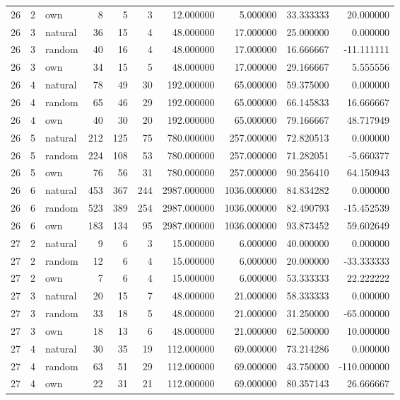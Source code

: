 \begin{table}[htbp]
\begin{tabular}{rrlrrrrrrr}
26 & 2 & own & 8 & 5 & 3 & 12.000000 & 5.000000 & 33.333333 & 20.000000 \\
26 & 3 & natural & 36 & 15 & 4 & 48.000000 & 17.000000 & 25.000000 & 0.000000 \\
26 & 3 & random & 40 & 16 & 4 & 48.000000 & 17.000000 & 16.666667 & -11.111111 \\
26 & 3 & own & 34 & 15 & 5 & 48.000000 & 17.000000 & 29.166667 & 5.555556 \\
26 & 4 & natural & 78 & 49 & 30 & 192.000000 & 65.000000 & 59.375000 & 0.000000 \\
26 & 4 & random & 65 & 46 & 29 & 192.000000 & 65.000000 & 66.145833 & 16.666667 \\
26 & 4 & own & 40 & 30 & 20 & 192.000000 & 65.000000 & 79.166667 & 48.717949 \\
26 & 5 & natural & 212 & 125 & 75 & 780.000000 & 257.000000 & 72.820513 & 0.000000 \\
26 & 5 & random & 224 & 108 & 53 & 780.000000 & 257.000000 & 71.282051 & -5.660377 \\
26 & 5 & own & 76 & 56 & 31 & 780.000000 & 257.000000 & 90.256410 & 64.150943 \\
26 & 6 & natural & 453 & 367 & 244 & 2987.000000 & 1036.000000 & 84.834282 & 0.000000 \\
26 & 6 & random & 523 & 389 & 254 & 2987.000000 & 1036.000000 & 82.490793 & -15.452539 \\
26 & 6 & own & 183 & 134 & 95 & 2987.000000 & 1036.000000 & 93.873452 & 59.602649 \\
27 & 2 & natural & 9 & 6 & 3 & 15.000000 & 6.000000 & 40.000000 & 0.000000 \\
27 & 2 & random & 12 & 6 & 4 & 15.000000 & 6.000000 & 20.000000 & -33.333333 \\
27 & 2 & own & 7 & 6 & 4 & 15.000000 & 6.000000 & 53.333333 & 22.222222 \\
27 & 3 & natural & 20 & 15 & 7 & 48.000000 & 21.000000 & 58.333333 & 0.000000 \\
27 & 3 & random & 33 & 18 & 5 & 48.000000 & 21.000000 & 31.250000 & -65.000000 \\
27 & 3 & own & 18 & 13 & 6 & 48.000000 & 21.000000 & 62.500000 & 10.000000 \\
27 & 4 & natural & 30 & 35 & 19 & 112.000000 & 69.000000 & 73.214286 & 0.000000 \\
27 & 4 & random & 63 & 51 & 29 & 112.000000 & 69.000000 & 43.750000 & -110.000000 \\
27 & 4 & own & 22 & 31 & 21 & 112.000000 & 69.000000 & 80.357143 & 26.666667 \\

\end{tabular}
\end{table}
